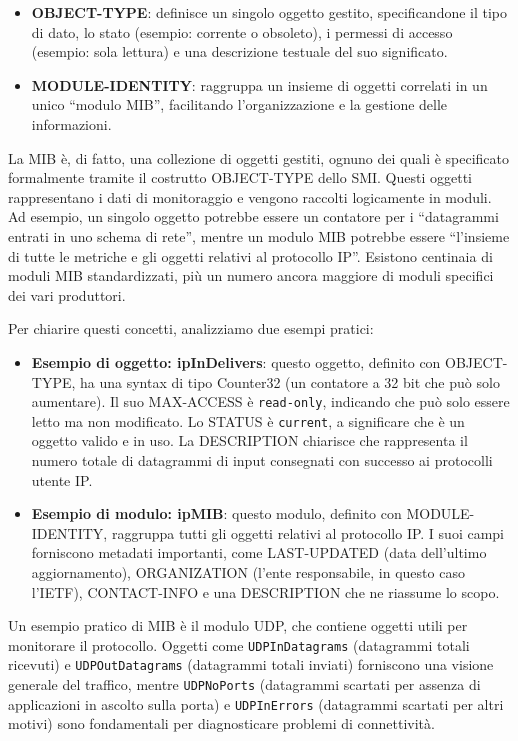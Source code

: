 \begin{itemize}
\item \textbf{OBJECT-TYPE}: definisce un singolo oggetto gestito,
specificandone il tipo di dato, lo stato (esempio: corrente o obsoleto), i
permessi di accesso (esempio: sola lettura) e una descrizione testuale del
suo significato.
\item \textbf{MODULE-IDENTITY}: raggruppa un insieme di oggetti correlati in un
unico ``modulo MIB'', facilitando l'organizzazione e la gestione delle
informazioni.
\end{itemize}

La MIB è, di fatto, una collezione di oggetti gestiti, ognuno dei quali è
specificato formalmente tramite il costrutto OBJECT-TYPE dello SMI. Questi
oggetti rappresentano i dati di monitoraggio e vengono raccolti logicamente in
moduli. Ad esempio, un singolo oggetto potrebbe essere un contatore per i
``datagrammi entrati in uno schema di rete'', mentre un modulo MIB potrebbe
essere ``l'insieme di tutte le metriche e gli oggetti relativi al protocollo
IP''. Esistono centinaia di moduli MIB standardizzati, più un numero ancora
maggiore di moduli specifici dei vari produttori.

Per chiarire questi concetti, analizziamo due esempi pratici:

\begin{itemize}
\item \textbf{Esempio di oggetto: ipInDelivers}: questo oggetto, definito con
OBJECT-TYPE, ha una syntax di tipo Counter32 (un contatore a 32 bit che può
solo aumentare). Il suo MAX-ACCESS è \texttt{read-only}, indicando che può
solo essere letto ma non modificato. Lo STATUS è \texttt{current}, a
significare che è un oggetto valido e in uso. La DESCRIPTION chiarisce che
rappresenta il numero totale di datagrammi di input consegnati con successo
ai protocolli utente IP.
\item \textbf{Esempio di modulo: ipMIB}: questo modulo, definito con
MODULE-IDENTITY, raggruppa tutti gli oggetti relativi al protocollo IP. I suoi
campi forniscono metadati importanti, come LAST-UPDATED (data dell'ultimo
aggiornamento), ORGANIZATION (l'ente responsabile, in questo caso l'IETF),
CONTACT-INFO e una DESCRIPTION che ne riassume lo scopo.
\end{itemize}

Un esempio pratico di MIB è il modulo UDP, che contiene oggetti utili per
monitorare il protocollo. Oggetti come \texttt{UDPInDatagrams}
(datagrammi totali ricevuti) e \texttt{UDPOutDatagrams} (datagrammi totali
inviati) forniscono una visione generale del traffico, mentre
\texttt{UDPNoPorts} (datagrammi scartati per assenza di applicazioni in ascolto
sulla porta) e \texttt{UDPInErrors} (datagrammi scartati per altri motivi)
sono fondamentali per diagnosticare problemi di connettività.

